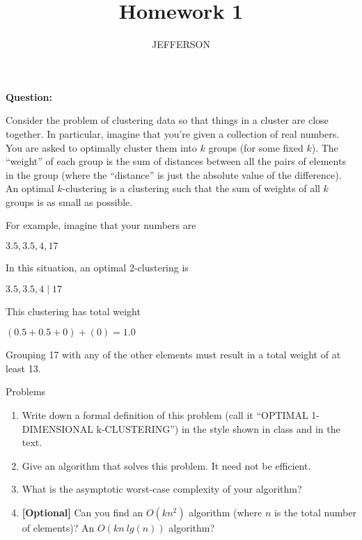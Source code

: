 \documentclass[11pt,letterpaper,oneside]{article}
\title{Homework 1}
\author{JEFFERSON}
\date{}
\begin{document}
\maketitle


\noindent\textbf{Question:}

Consider the problem of clustering data so that things in a cluster are close together. In particular, imagine that you're given a collection of real numbers. You are asked to optimally cluster them into $k$ groups (for some fixed $k$). The ``weight'' of each group is the sum of distances between all the pairs of elements in the group (where the ``distance'' is just the absolute value of the difference). An optimal $k$-clustering is a clustering such that the sum of weights of all $k$ groups is as small as possible.

For example, imagine that your numbers are

\hspace{2em} $3.5, 3.5, 4, 17$

In this situation, an optimal 2-clustering is

\hspace{2em} $3.5, 3.5, 4 \mid 17$

This clustering has total weight

\hspace{2em} $(0.5 + 0.5 + 0) + (0) = 1.0$

Grouping 17 with any of the other elements must result in a total weight of at least 13.

\null

\noindent Problems
\vspace{-1em}
\begin{enumerate}
  \itemsep1pt \parskip0pt 
  \item Write down a formal definition of this problem (call it ``OPTIMAL 1-DIMENSIONAL k-CLUSTERING'') in the style shown in class and in the text.
  \item Give an algorithm that solves this problem. It need not be efficient.
  \item What is the asymptotic worst-case complexity of your algorithm?
  \item \textbf{[Optional]} Can you find an $O(kn^2)$ algorithm (where $n$ is the total number of elements)? An $O(kn\ lg(n))$ algorithm?
\end{enumerate}
\end{document}
